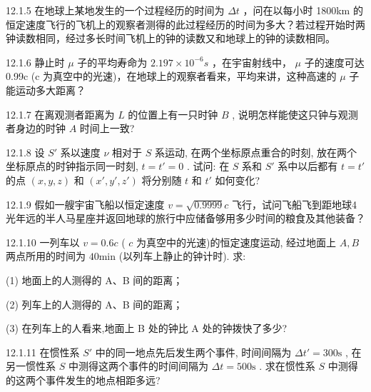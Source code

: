 \begin{problem}{12.1.5}
在地球上某地发生的一个过程经历的时间为 $\Delta t$ ，问在以每小时 1800km 的恒定速度飞行的飞机上的观察者测得的此过程经历的时间为多大？若过程开始时两钟读数相同，经过多长时间飞机上的钟的读数又和地球上的钟的读数相同。
\end{problem}
\clearpage


\begin{problem}{12.1.6}
静止时 $\mu$ 子的平均寿命为 $2.197 \times 10^{-6} s$ ，在宇宙射线中， $\mu$ 子的速度可达 0.99c (c 为真空中的光速)，在地球上的观察者看来，平均来讲，这种高速的 $\mu$ 子能运动多大距离？
\end{problem}
\clearpage


\begin{problem}{12.1.7}
在离观测者距离为 $L$ 的位置上有一只时钟 $B$ , 说明怎样能使这只钟与观测者身边的时钟 $A$ 时间上一致?
\end{problem}
\clearpage


\begin{problem}{12.1.8}
设 $S'$ 系以速度 $\nu$ 相对于 $S$ 系运动, 在两个坐标原点重合的时刻, 放在两个坐标原点的时钟指示同一时刻, $t = t' = 0$ . 试问: 在 $S$ 系和 $S'$ 系中以后都有 $t = t'$ 的点 $(x, y, z)$ 和 $(x', y', z')$ 将分别随 $t$ 和 $t'$ 如何变化?
\end{problem}
\clearpage


\begin{problem}{12.1.9}
假如一艘宇宙飞船以恒定速度 $v = \sqrt{0.9999} c$ 飞行，试问飞船飞到距地球4光年远的半人马星座并返回地球的旅行中应储备够用多少时间的粮食及其他装备？
\end{problem}
\clearpage


\begin{problem}{12.1.10}
一列车以 $v = 0.6c$ ( $c$ 为真空中的光速)的恒定速度运动, 经过地面上 $A, B$ 两点所用的时间为 $40\mathrm{min}$ (以列车上静止的钟计时). 求:

(1) 地面上的人测得的 A、B 间的距离；

(2) 列车上的人测得的 A、B 间的距离；

(3) 在列车上的人看来,地面上 B 处的钟比 A 处的钟拨快了多少?
\end{problem}
\clearpage


\begin{problem}{12.1.11}
在惯性系 $S'$ 中的同一地点先后发生两个事件, 时间间隔为 $\Delta t' = 300\mathrm{s}$ , 在另一惯性系 $S$ 中测得这两个事件的时间间隔为 $\Delta t = 500\mathrm{s}$ . 求在惯性系 $S$ 中测得的这两个事件发生的地点相距多远?
\end{problem}
\clearpage


